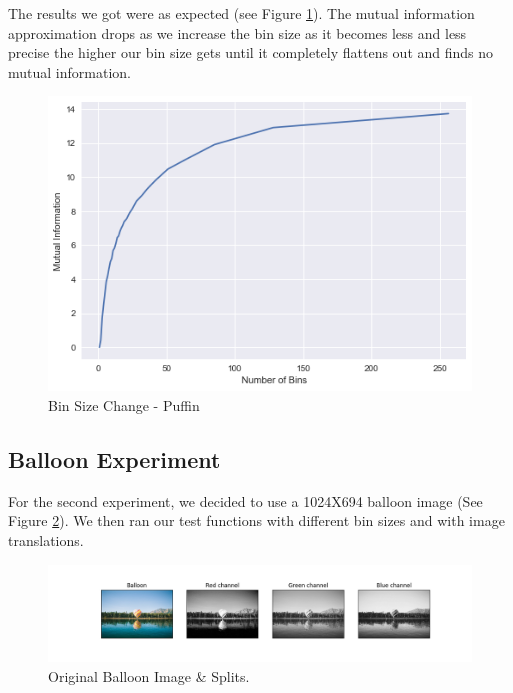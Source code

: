 \documentclass{article}
\begin{document}
\begin{flushleft}
The results we got were as expected (see Figure \ref{fig:puffin_binSize}). The mutual information approximation drops as we increase the bin size as it becomes less and less precise the higher our bin size gets until it completely flattens out and finds no mutual information. 
\end{flushleft}

\begin{figure}[H]
    \centering
    \includegraphics[width=\linewidth]{experiments/puffin/puffin-binSize.png}
    \caption{Bin Size Change - Puffin}
    \label{fig:puffin_binSize}
\end{figure}


\subsection{Balloon Experiment}
\vspace{2mm}

\begin{flushleft}
For the second experiment, we decided to use a 1024X694 balloon image (See Figure \ref{fig:balloon_original}). We then ran our test functions with different bin sizes and with image translations.
\end{flushleft}

\begin{figure}[H]
    \centering
    \includegraphics[width=12cm]{experiments/balloon/RGB1-Balloon.png}
    \caption{Original Balloon Image \& Splits.}
    \label{fig:balloon_original}
\end{figure}
\end{document}
